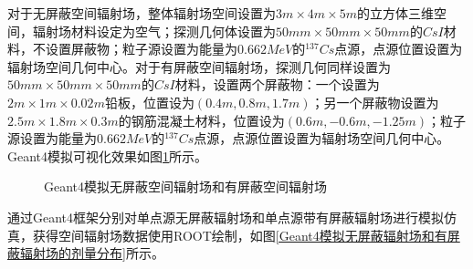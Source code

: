 对于无屏蔽空间辐射场，整体辐射场空间设置为$ 3m \times 4m \times 5m $的立方体三维空间，辐射场材料设定为空气；探测几何体设置为$ 50mm \times 50mm \times 50mm $的$ CsI $材料，不设置屏蔽物；粒子源设置为能量为$ 0.662MeV $的$ ^{137}Cs $点源，点源位置设置为辐射场空间几何中心。对于有屏蔽空间辐射场，探测几何同样设置为$ 50mm \times 50mm \times 50mm $的$ CsI $材料，设置两个屏蔽物：一个设置为$ 2m \times 1m \times 0.02m $铅板，位置设为$ (0.4m, 0.8m, 1.7m) $；另一个屏蔽物设置为$ 2.5m \times 1.8m \times 0.3m $的钢筋混凝土材料，位置设为$ (0.6m, -0.6m, -1.25m) $；粒子源设置为能量为$ 0.662MeV $的$ ^{137}Cs $点源，点源位置设置为辐射场空间几何中心。Geant4模拟可视化效果如图\ref{Geant4模拟无屏蔽空间辐射场和有屏蔽空间辐射场}所示。

\begin{figure}[htbp]
    \caption{Geant4模拟无屏蔽空间辐射场和有屏蔽空间辐射场}
    \label{Geant4模拟无屏蔽空间辐射场和有屏蔽空间辐射场}
\end{figure}

通过Geant4框架分别对单点源无屏蔽辐射场和单点源带有屏蔽辐射场进行模拟仿真，获得空间辐射场数据使用ROOT绘制，如图\ref{Geant4模拟无屏蔽辐射场和有屏蔽辐射场的剂量分布}所示。

